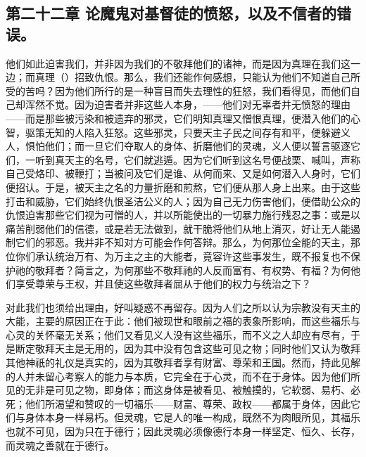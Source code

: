 
\subsection{第二十二章 论魔鬼对基督徒的愤怒，以及不信者的错误。}

他们如此迫害我们，并非因为我们的不敬拜他们的诸神，而是因为真理在我们这一边；而真理（）招致仇恨。那么，我们还能作何感想，只能认为他们不知道自己所受的苦吗？因为他们所行的是一种盲目而失去理性的狂怒，我们看得见，而他们自己却浑然不觉。因为迫害者并非这些人本身，——他们对无辜者并无愤怒的理由——而是那些被污染和被遗弃的邪灵，它们明知真理又憎恨真理，便潜入他们的心智，驱策无知的人陷入狂怒。这些邪灵，只要天主子民之间存有和平，便躲避义人，惧怕他们；而一旦它们夺取人的身体、折磨他们的灵魂，义人便以誓言驱逐它们，一听到真天主的名号，它们就逃遁。因为它们听到这名号便战栗、喊叫，声称自己受烙印、被鞭打；当被问及它们是谁、从何而来、又是如何潜入人身时，它们便招认。于是，被天主之名的力量折磨和煎熬，它们便从那人身上出来。由于这些打击和威胁，它们始终仇恨圣洁公义的人；因为自己无力伤害他们，便借助公众的仇恨迫害那些它们视为可憎的人，并以所能使出的一切暴力施行残忍之事：或是以痛苦削弱他们的信德，或是若无法做到，就干脆将他们从地上消灭，好让无人能遏制它们的邪恶。我并非不知对方可能会作何答辩。那么，为何那位全能的天主，那位你们承认统治万有、为万主之主的大能者，竟容许这些事发生，既不报复也不保护祂的敬拜者？简言之，为何那些不敬拜祂的人反而富有、有权势、有福？为何他们享受尊荣与王权，并且使这些敬拜者屈从于他们的权力与统治之下？\par

对此我们也须给出理由，好叫疑惑不再留存。因为人们之所以认为宗教没有天主的大能，主要的原因正在于此：他们被现世和眼前之福的表象所影响，而这些福乐与心灵的关怀毫无关系；他们又看见义人没有这些福乐，而不义之人却应有尽有，于是断定敬拜天主是无用的，因为其中没有包含这些可见之物；同时他们又认为敬拜其他神祇的礼仪是真实的，因为其敬拜者享有财富、尊荣和王国。然而，持此见解的人并未留心考察人的能力与本质，它完全在于心灵，而不在于身体。因为他们所见的无非是可见之物，即身体；而这身体是被看见、被触摸的，它软弱、易朽、必死；他们所渴望和赞叹的一切福乐——财富、尊荣、政权——都属于身体，因此它们与身体本身一样易朽。但灵魂，它是人的唯一构成，既然不为肉眼所见，其福乐也就不可见，因为只在于德行；因此灵魂必须像德行本身一样坚定、恒久、长存，而灵魂之善就在于德行。\par


